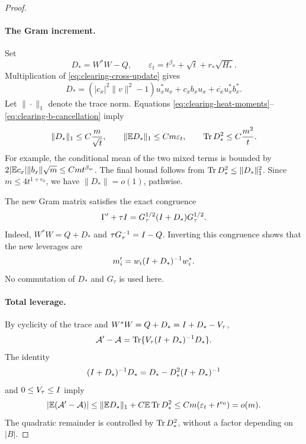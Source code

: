 \begin{proof}
\paragraph{The Gram increment.}
Set
\[
 D_* = W^*W-Q,\qquad
 \varepsilon_t=t^{\beta_w}+\sqrt t+r_*\sqrt{H_*}.
\]
Multiplication of \eqref{eq:clearing-cross-update} gives
\begin{equation}\label{eq:clearing-gram-increment}
 D_*=(|c_x|^2\|v\|^2-1)u_x^*u_x
       +c_xb_xu_x+\overline{c_x}u_x^*b_x^*.
\end{equation}
Let \(\|\cdot\|_1\) denote the trace norm.  Equations
\eqref{eq:clearing-heat-moments}--\eqref{eq:clearing-b-cancellation}
imply
\begin{equation}\label{eq:clearing-gram-bounds}
 \|D_*\|_1\le C\frac m{\sqrt t},\qquad
 \|\mathbb E D_*\|_1\le Cm\varepsilon_t,\qquad
 \operatorname{Tr} D_*^2\le C\frac{m^2}{t}.
\end{equation}
For example, the conditional mean of the two mixed terms is bounded
by \(2|\mathbb E c_x|\|b_x\|\sqrt m\le Cmt^{\beta_w}\).
The final bound follows from
\(\operatorname{Tr} D_*^2\le\|D_*\|_1^2\).
Since \(m\le4t^{1+e_0}\), we have \(\|D_*\|=o(1)\), pathwise.

The new Gram matrix satisfies the exact congruence
\begin{equation}\label{eq:clearing-gram-congruence}
 \Gamma'+\tau I
   =G_\tau^{1/2}(I+D_*)G_\tau^{1/2}.
\end{equation}
Indeed, \(W^*W=Q+D_*\) and \(\tau G_\tau^{-1}=I-Q\).
Inverting this congruence shows that the new leverages are
\begin{equation}\label{eq:clearing-leverage-update}
 m_i'=w_i(I+D_*)^{-1}w_i^*.
\end{equation}
No commutation of \(D_*\) and \(G_\tau\) is used here.

\paragraph{Total leverage.}
By cyclicity of the trace and \(W^*W=Q+D_*=I+D_*-V_\tau\),
\begin{equation}\label{eq:clearing-total-leverage}
 \mathcal A'-\mathcal A
 =\operatorname{Tr}\{V_\tau(I+D_*)^{-1}D_*\}.
\end{equation}
The identity
\[
 (I+D_*)^{-1}D_*
   =D_*-D_*^2(I+D_*)^{-1}
\]
and \(0\le V_\tau\le I\) imply
\[
 |\mathbb E(\mathcal A'-\mathcal A)|
 \le \|\mathbb E D_*\|_1+C\mathbb E\operatorname{Tr} D_*^2
 \le Cm(\varepsilon_t+t^{e_0})=o(m).
\]
The quadratic remainder is controlled by \(\operatorname{Tr} D_*^2\), without a
factor depending on \(|B|\).


\end{proof}
